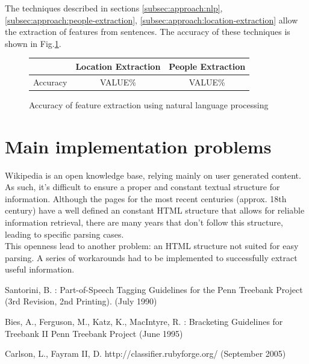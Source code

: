 \documentclass{llncs}
\begin{document}
The techniques described in sections \ref{subsec:approach:nlp}, \ref{subsec:approach:people-extraction}, \ref{subsec:approach:location-extraction} allow the extraction of features from sentences. The accuracy of these techniques is shown in Fig.\ref{fig:classifier-accuracy}.

\begin{figure}[h!]
	\centering
	\begin{tabular}{c|c|c}
		& Location Extraction & People Extraction\\
		\hline
		Accuracy & VALUE\% & VALUE\% \\
	\end{tabular}
	\caption{Accuracy of feature extraction using natural language processing}
	\label{fig:classifier-accuracy}
\end{figure}

\section{Main implementation problems}

Wikipedia is an open knowledge base, relying mainly on user generated content. As such, it's difficult to ensure a proper and constant textual structure for information. Although the pages for the most recent centuries (approx. 18th century) have a well defined an constant HTML structure that allows for reliable information retrieval, there are many years that don't follow this structure, leading to specific parsing cases.\\

This openness lead to another problem: an HTML structure not suited for easy parsing. A series of workarounds had to be implemented to successfully extract useful information.

%
%
\begin{thebibliography}{}
%
Santorini, B. :
Part-of-Speech Tagging Guidelines for the
Penn Treebank Project (3rd Revision, 2nd Printing).
(July 1990)

Bies, A., Ferguson, M., Katz, K., MacIntyre, R. :
Bracketing Guidelines for Treebank II
Penn Treebank Project
(June 1995)

Carlson, L., Fayram II, D.
http://classifier.rubyforge.org/
(September 2005)

\end{thebibliography}
\end{document}
